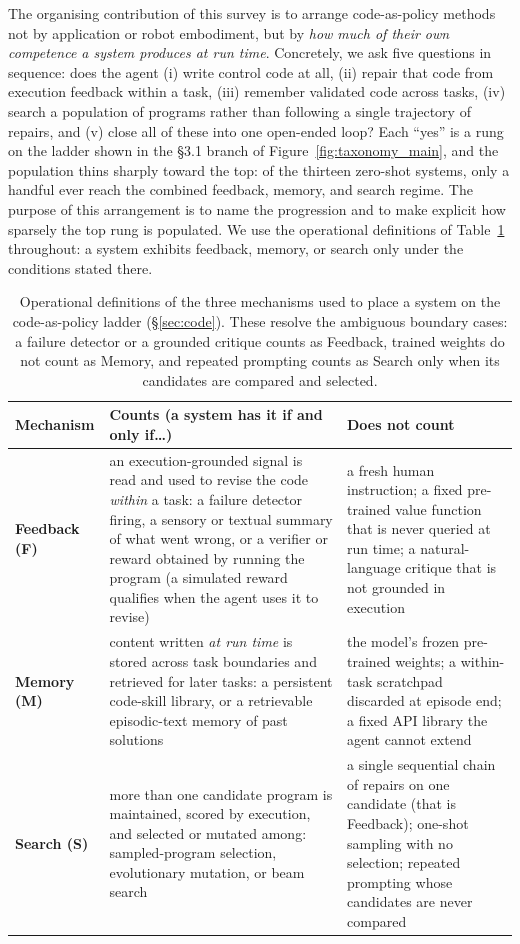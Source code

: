 \documentclass[acmsmall,screen,nonacm]{acmart}
\begin{document}
The organising contribution of this survey is to arrange code-as-policy methods not by
application or robot embodiment, but by \emph{how much of their own competence a system
produces at run time}. Concretely, we ask five questions in sequence: does the agent (i)
write control code at all, (ii) repair that code from execution feedback within a task,
(iii) remember validated code across tasks, (iv) search a population of programs rather
than following a single trajectory of repairs, and (v) close all of these into one
open-ended loop? Each ``yes'' is a rung on the ladder shown in the \S3.1 branch of
Figure~\ref{fig:taxonomy_main}, and
the population thins sharply toward the top: of the thirteen zero-shot systems, only a
handful ever reach the combined feedback, memory, and search regime. The purpose of this
arrangement is to name the progression and to make explicit how sparsely the top rung is
populated. We use the operational definitions of Table~\ref{tab:defs} throughout: a system
exhibits feedback, memory, or search only under the conditions stated there.

%
%
\begin{table}[t]
\centering
\footnotesize
\renewcommand{\arraystretch}{1.3}
\begin{tabular}{@{}l p{} p{}@{}}
\toprule
\textbf{Mechanism} & \textbf{Counts (a system has it if and only if\ldots)} & \textbf{Does not count} \\
\midrule
\textbf{Feedback (F)} &
an execution-grounded signal is read and used to revise the code \emph{within} a task: a
failure detector firing, a sensory or textual summary of what went wrong, or a verifier or
reward obtained by running the program (a simulated reward qualifies when the agent uses it to
revise) &
a fresh human instruction; a fixed pre-trained value function that is never queried at run
time; a natural-language critique that is not grounded in execution \\
\textbf{Memory (M)} &
content written \emph{at run time} is stored across task boundaries and retrieved for later
tasks: a persistent code-skill library, or a retrievable episodic-text memory of past
solutions &
the model's frozen pre-trained weights; a within-task scratchpad discarded at episode end; a
fixed API library the agent cannot extend \\
\textbf{Search (S)} &
more than one candidate program is maintained, scored by execution, and selected or mutated
among: sampled-program selection, evolutionary mutation, or beam search &
a single sequential chain of repairs on one candidate (that is Feedback); one-shot sampling
with no selection; repeated prompting whose candidates are never compared \\
\bottomrule
\end{tabular}
\caption{Operational definitions of the three mechanisms used to place a system on the
code-as-policy ladder (\S\ref{sec:code}). These resolve the ambiguous boundary cases: a
failure detector or a grounded critique counts as Feedback, trained weights do not count as
Memory, and repeated prompting counts as Search only when its candidates are compared and
selected.}
\label{tab:defs}
\end{table}
 
\end{document}
